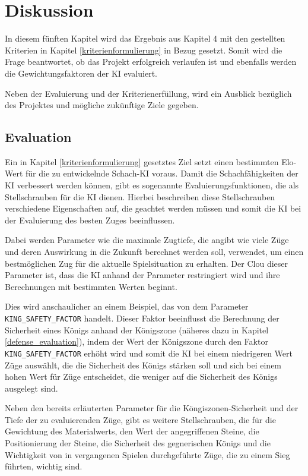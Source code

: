 \chapter{Diskussion}

In diesem fünften Kapitel wird das Ergebnis aus Kapitel 4 mit den gestellten Kriterien in Kapitel \ref{kriterienformulierung} in Bezug gesetzt. Somit wird die Frage beantwortet, ob das Projekt erfolgreich verlaufen ist und ebenfalls werden die Gewichtungsfaktoren der KI evaluiert. 

Neben der Evaluierung und der Kriterienerfüllung, wird ein Ausblick bezüglich des Projektes und mögliche zukünftige Ziele gegeben.

\section{Evaluation}\label{evaluation}
Ein in Kapitel \ref{kriterienformulierung} gesetztes Ziel setzt einen bestimmten Elo-Wert für die zu entwickelnde Schach-KI voraus. Damit die Schachfähigkeiten der KI verbessert werden können, gibt es sogenannte Evaluierungsfunktionen, die als Stellschrauben für die KI dienen. Hierbei beschreiben diese Stellschrauben verschiedene Eigenschaften auf, die geachtet werden müssen und somit die KI bei der Evaluierung des besten Zuges beeinflussen. 

Dabei werden Parameter wie die maximale Zugtiefe, die angibt wie viele Züge und deren Auswirkung in die Zukunft berechnet werden soll, verwendet, um einen bestmöglichen Zug für die aktuelle Spielsituation zu erhalten. Der Clou dieser Parameter ist, dass die KI anhand der Parameter restringiert wird und ihre Berechnungen mit bestimmten Werten beginnt.

Dies wird anschaulicher an einem Beispiel, das von dem Parameter \texttt{KING\_SAFETY\_FACTOR} handelt. Dieser Faktor beeinflusst die Berechnung der Sicherheit eines Königs anhand der Königszone (näheres dazu in Kapitel \ref{defense_evaluation}), indem der Wert der Königszone durch den Faktor \texttt{KING\_SAFETY\_FACTOR} erhöht wird und somit die KI bei einem niedrigeren Wert Züge auswählt, die die Sicherheit des Königs stärken soll und sich bei einem hohen Wert für Züge entscheidet, die weniger auf die Sicherheit des Königs ausgelegt sind.

Neben den bereits erläuterten Parameter für die Köngiszonen-Sicherheit und der Tiefe der zu evaluierenden Züge, gibt es weitere Stellschrauben, die für die Gewichtung des Materialwerts, den Wert der angegriffenen Steine, die Positionierung der Steine, die Sicherheit des gegnerischen Königs und die Wichtigkeit von in vergangenen Spielen durchgeführte Züge, die zu einem Sieg führten, wichtig sind.


